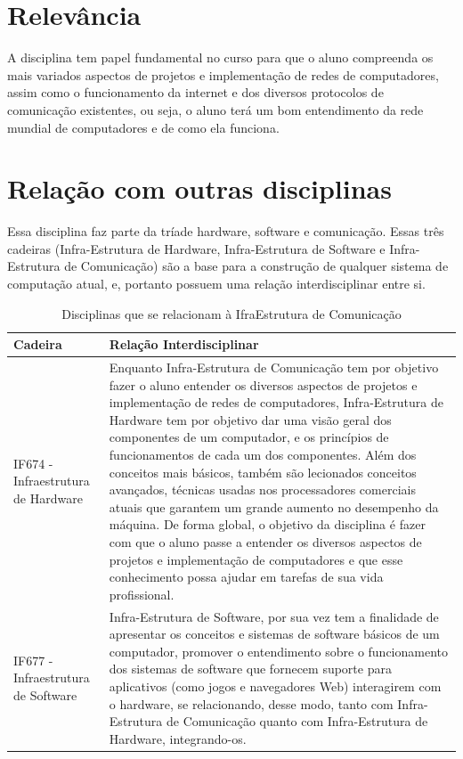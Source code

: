 \documentclass[10pt, a4paper]{article}
\begin{document}
\section{Relevância}

A disciplina tem papel fundamental no curso para que o aluno compreenda os mais variados aspectos de projetos e implementação de redes de computadores, assim como o funcionamento da internet e dos diversos protocolos de comunicação existentes\cite{jk}, ou seja, o aluno terá um bom entendimento da rede mundial de computadores e de como ela funciona.

\section{Relação com outras disciplinas}

Essa disciplina faz parte da tríade hardware, software e comunicação. Essas três cadeiras (Infra-Estrutura de Hardware, Infra-Estrutura de Software e Infra-Estrutura de Comunicação) são a base para a construção de qualquer sistema de computação atual, e, portanto possuem uma relação interdisciplinar entre si.\\[0.5cm]

\begin{table}[h]
\centering
\begin{tabular}{|l|p{8cm}|} \hline
\textbf{Cadeira} & \textbf{Relação Interdisciplinar}\\\hline
IF674 - Infraestrutura de Hardware & Enquanto Infra-Estrutura de Comunicação tem por objetivo fazer o aluno entender os diversos aspectos de projetos e implementação de redes de computadores, Infra-Estrutura de Hardware tem por objetivo dar uma visão geral dos componentes de um computador, e os princípios de funcionamentos de cada um dos componentes. Além dos conceitos mais básicos, também são lecionados conceitos avançados, técnicas usadas nos processadores comerciais atuais que garantem um grande aumento no desempenho da máquina. De forma global, o objetivo da disciplina é fazer com que o aluno passe a entender os diversos aspectos de projetos e implementação de computadores e que esse conhecimento possa ajudar em tarefas de sua vida profissional.\\\hline
IF677 - Infraestrutura de Software & Infra-Estrutura de Software, por sua vez tem a finalidade de apresentar os conceitos e sistemas de software básicos de um computador, promover o entendimento sobre o funcionamento dos sistemas de software que fornecem suporte para aplicativos (como jogos e navegadores Web) interagirem com o hardware, se relacionando, desse modo, tanto com Infra-Estrutura de Comunicação quanto com Infra-Estrutura de Hardware, integrando-os.\\\hline
\end{tabular}
\caption{Disciplinas que se relacionam à IfraEstrutura de Comunicação}
\end{table}



\end{document}
